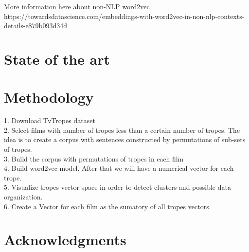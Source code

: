 \documentclass[letterpaper]{article}
\begin{document}

More information here about non-NLP word2vec
https://towardsdatascience.com/embeddings-with-word2vec-in-non-nlp-contexts-details-e879b093d34d

\section{State of the art}

\section{Methodology}

1. Download TvTropes dataset \\
2. Select films with number of tropes less than a certain number of tropes. The idea is to create a corpus with sentences constructed by permutations of sub-sets of tropes. \\
3. Build the corpus with permutations of tropes in each film \\
4. Build word2vec model. After that we will have a numerical vector for each trope. \\
5. Visualize tropes vector space in order to detect clusters and possible data organization. \\ 
6. Create a Vector for each film as the sumatory of all tropes vectors. \\

 


\section{Acknowledgments}




\end{document}
